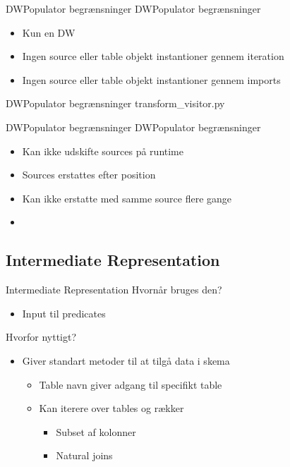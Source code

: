 \begin{frame}{DWPopulator begrænsninger}{}
	DWPopulator begrænsninger
  \begin{itemize}
    \item<1-> Kun en DW
    \item<2-> Ingen source eller table objekt instantioner gennem iteration
    \item<3-> Ingen source eller table objekt instantioner gennem imports
  \end{itemize}
\end{frame}

\begin{frame}{DWPopulator begrænsninger}{}
  transform\_visitor.py
\end{frame}

\begin{frame}{DWPopulator begrænsninger}{}
  DWPopulator begrænsninger
	\begin{itemize}
		\item<1-> Kan ikke udskifte sources på runtime
		\item<2-> Sources erstattes efter position
		\item<3-> Kan ikke erstatte med samme source flere gange
		\item<4-> 
	\end{itemize}
\end{frame}

\subsection{Intermediate Representation}
\begin{frame}{Intermediate Representation}{}
  Hvornår bruges den?
  \begin{itemize}
    \item<1-> Input til predicates
  \end{itemize}
  Hvorfor nyttigt?
  \begin{itemize}
    \item<2-> Giver standart metoder til at tilgå data i skema
		\begin{itemize}
			\item<3-> Table navn giver adgang til specifikt table
			\item<4-> Kan iterere over tables og rækker
			\begin{itemize}
				\item<5-> Subset af kolonner
				\item<6-> Natural joins
			\end{itemize}
		\end{itemize}
  \end{itemize}
\end{frame}

